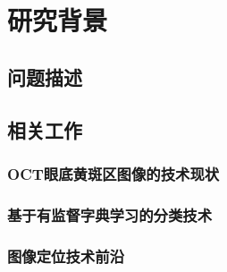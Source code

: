\chapter{研究背景}

\section{问题描述}

\section{相关工作}

    \subsection{OCT眼底黄斑区图像的技术现状}

    \subsection{基于有监督字典学习的分类技术}

\subsection{图像定位技术前沿}